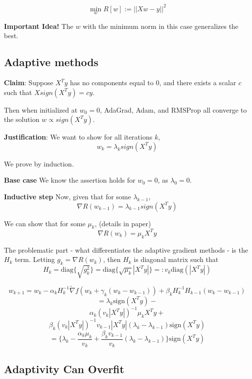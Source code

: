 \documentclass[12pt]{article}
\begin{document}
$$\min_w R[w] := || Xw - y ||^2$$


\vspace{5mm}
\textbf{Important Idea!} The $w$ with the minimum norm in this case generalizes the best.

\newpage

\subsection{Adaptive methods}
\textbf{Claim}:  Suppose $X^T y$ has no components equal to 0, and there exists a scalar $c$ such that $X sign(X^T y) = cy$.

Then when initialized at $w_0 = 0$, AdaGrad, Adam, and RMSProp all converge to the solution $w \propto sign(X^T y)$.

\vspace{3mm}
\textbf{Justification}: 
We want to show for all iterations $k$, 
$$w_k = \lambda_k sign(X^T y)$$

We prove by induction.

\textbf{Base case} We know the assertion holds for $w_0 = 0$, as $\lambda_0 = 0$.

\textbf{Inductive step} Now, given that for some $\lambda_{k-1}$,
$$\nabla R(w_{k-1}) = \lambda_{k-1} sign(X^T y)$$

We can show that for some $\mu_k$, (details in paper)
$$\nabla R(w_k) = \mu_k X^T y$$

The problematic part - what differentiates the adaptive gradient methods - is the $H_k$ term. 
Letting $g_k = \nabla R(w_k)$, then $H_k$ is diagonal matrix such that
$$H_k = \text{diag} \bigg\{ \sqrt{ g_k^2 } \bigg\} = \text{diag} \bigg\{ \sqrt{ \mu_k } |X^T y| \bigg\} =: v_k \text{diag} (  | X^T y | ) $$

$$w_{k+1} = w_k - \alpha_k H_k^{-1} \tilde{ \nabla } f ( w_k + \gamma_k (w_k - w_{k-1})) + \beta_k H_k^{-1} H_{k-1} (w_k - w_{k-1}) $$
$$= \lambda_k \text{sign} (X^T y) - $$
$$\alpha_k {( v_k  | X^T y | )}^{-1}\mu_k X^T y + $$
$$\beta_k {( v_k | X^T y | )}^{-1} v_{k-1} | X^T y | ( \lambda_k - \lambda_{k-1} ) \text{sign} (X^T y)$$
$$= \bigg\{ \lambda_k - \frac{ \alpha_k \mu_k }{ v_k } + \frac{ \beta_k v_{k-1} }{ v_k } ( \lambda_k - \lambda_{k-1} ) \bigg\} \text{sign} (X^T y)$$

\newpage
\subsection{Adaptivity Can Overfit}
\end{document}
